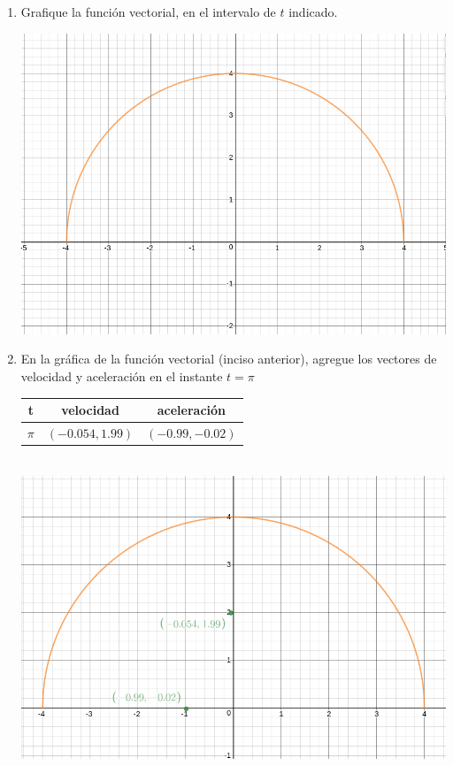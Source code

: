 \documentclass[10pt,letterpaper,fleqn]{article}
\begin{document}
\begin{enumerate}
\begin{enumerate}
            \item Grafique la función vectorial, en el intervalo de $t$ indicado.
            \begin{center}
                \includegraphics[scale=.3]{assets/img/ejercicio2(b).png}
            \end{center}
            \item En la gráfica de la función vectorial (inciso anterior), agregue los vectores de velocidad y aceleración en el instante $t = \pi$ 
            \begin{center}
                \begin{tabular}{|c|c|c|} \hline 
                    t & velocidad & aceleración \\ \hline
                    $\pi$ & $(-0.054,1.99) $ & $(-0.99,-0.02)$  \\ \hline
                \end{tabular}
                \\
                \includegraphics[scale=.3]{assets/img/ejercicio2(c).png}
            \end{center}


\end{enumerate}
\end{enumerate}
\end{document}
